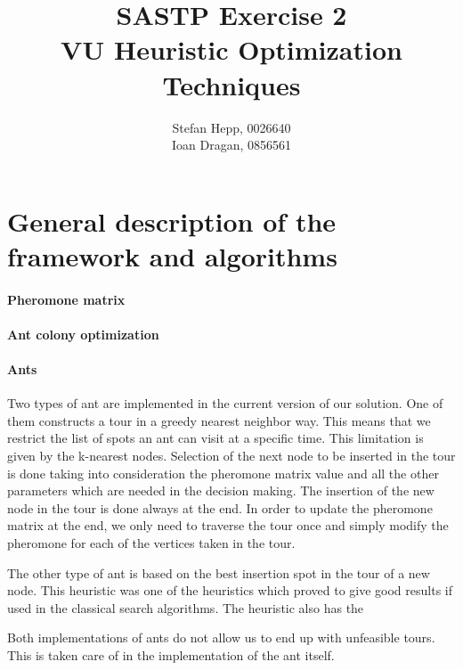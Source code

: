 \documentclass{article}
\title{SASTP Exercise 2\\
{VU Heuristic Optimization Techniques} }
\author{Stefan Hepp, 0026640 \\
Ioan Dragan, 0856561 }
\begin{document}
\maketitle
\section{General description of the framework and algorithms}

\paragraph{Pheromone matrix}

\paragraph{Ant colony optimization}

\paragraph{Ants}

Two types of ant are implemented in the current version of our solution. One of them constructs a tour in a greedy nearest neighbor way. This means that we restrict the list of spots an ant can visit at a specific time. This limitation is given by the k-nearest nodes. Selection of the next node to be inserted in the tour is done taking into consideration the pheromone matrix value and all the other parameters which are needed in the decision making. The insertion of the new node in the tour is done always at the end. In order to update the pheromone matrix at the end, we only need to traverse the tour once and simply modify the pheromone for each of the vertices taken in the tour.

The other type of ant is based on the best insertion spot in the tour of a new node. This heuristic was one of the heuristics which proved to give good results if used in the classical search algorithms. The heuristic also has the 

Both implementations of ants do not allow us to end up with unfeasible tours. This is taken care of in the implementation of the ant itself. 





\end{document}
